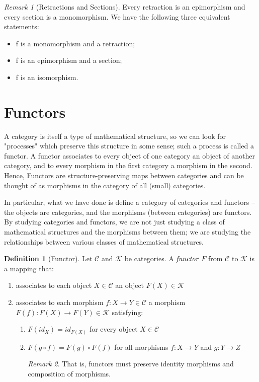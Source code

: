 \documentclass[10pt, oneside, reqno]{amsart}
\theoremstyle{plain}%
\theoremstyle{definition}
\newtheorem{defn}[thm]{Definition}
\theoremstyle{remark}
\newtheorem*{rem}{Remark}
\begin{document}
\begin{rem}[Retractions and Sections]
Every retraction is an epimorphism and every section is a monomorphism.
We have the following three equivalent statements:
\begin{itemize}
\item f is a monomorphism and a retraction;
\item f is an epimorphism and a section;
\item f is an isomorphism.
\end{itemize}
\end{rem}


\section{Functors} %
\label{sec:functors}
A category is itself a type of mathematical structure, so we can look for "processes" which preserve this structure in some sense; such a process is called a functor.
A functor associates to every object of one category an object of another category, and to every morphism in the first category a morphism in the second.
Hence, Functors are structure-preserving maps between categories and can be thought of as morphisms in the category of all (small) categories.

In particular, what we have done is define a category of categories and functors – the objects are categories, and the morphisms (between categories) are functors.
By studying categories and functors, we are not just studying a class of mathematical structures and the morphisms between them;
we are studying the relationships between various classes of mathematical structures.

\begin{defn}[Functor]
	Let $\mathcal{C}$ and $\mathcal{K}$ be categories. A $\emph{functor}$ $F$ from $\mathcal{C}$ to $\mathcal{K}$ is a mapping that:
	\begin{enumerate}
		\item associates to each object $X \in \mathcal{C}$ an object $F(X) \in  \mathcal{K}$
		
		\item associates to each morphism $f : X \to Y \in \mathcal{C}$ a morphism $F(f) : F(X) \to F(Y) \in \mathcal{K}$
		satisfying:
		\begin{enumerate}
			\item $F(id_{X}) = id_{F(X)}$ for every object $X \in \mathcal{C}$
			
			\item $F(g \circ f) = F(g) \circ F(f)$ for all morphisms $f : X \to Y$ and $g : Y \to Z$
			\begin{rem}
				That is, functors must preserve identity morphisms and composition of morphisms.
			\end{rem}
		\end{enumerate}
	\end{enumerate}
\end{defn}
\end{document}
